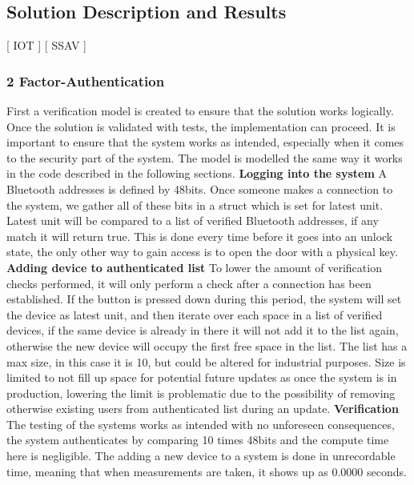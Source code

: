 \subsection{Solution Description and Results}
[ IOT ] [ SSAV ]
\subsubsection{2 Factor-Authentication}
First a verification model is created to ensure that the solution works logically. Once the solution is validated with tests, the implementation can proceed. It is important to ensure that the system works as intended, especially when it comes to the security part of the system. The model is modelled the same way it works in the code described in the following sections.
\newline
\textbf{Logging into the system}\newline
A Bluetooth addresses is defined by 48bits\cite{BluetoothBeacon}. Once someone makes a connection to the system, we gather all of these bits in a struct which is set for latest unit. Latest unit will be compared to a list of verified Bluetooth addresses, if any match it will return true. This is done every time before it goes into an unlock state, the only other way to gain access is to open the door with a physical key.
\newline
\textbf{Adding device to authenticated list}\newline
To lower the amount of verification checks performed, it will only perform a check after a connection has been established. If the button is pressed down during this period, the system will set the device as latest unit, and then iterate over each space in a list of verified devices, if the same device is already in there it will not add it to the list again, otherwise the new device will occupy the first free space in the list. The list has a max size, in this case it is 10, but could be altered for industrial purposes. Size is limited to not fill up space for potential future updates as once the system is in production, lowering the limit is problematic due to the possibility of removing otherwise existing users from authenticated list during an update.
\newline
\textbf{Verification}\newline
The testing of the systems works as intended with no unforeseen consequences, the system authenticates by comparing 10 times 48bits and the compute time here is negligible. The adding a new device to a system is done in unrecordable time, meaning that when measurements are taken, it shows up as 0.0000 seconds.

